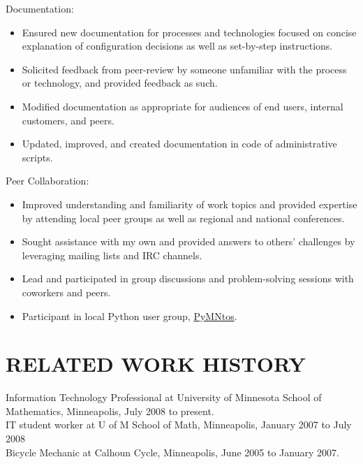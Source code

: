 \documentclass[line,margin]{res}
\begin{document}
\begin{resume}
    Documentation:
    \vspace{2 mm}
    \begin{itemize} \itemsep -1pt %
        \item Ensured new documentation for processes and technologies
        focused on concise explanation of configuration decisions as well
        as set-by-step instructions.
        \item Solicited feedback from peer-review by someone unfamiliar
        with the process or technology, and provided feedback as such.
        \item Modified documentation as appropriate for audiences of end
        users, internal customers, and peers.
        \item Updated, improved, and created documentation in code of
        administrative scripts.
    \end{itemize}

    Peer Collaboration:
    \vspace{2 mm}
    \begin{itemize} \itemsep -1pt %
        \item Improved understanding and familiarity of work topics and
        provided expertise by attending local peer groups as well as
        regional and national conferences.
        \item Sought assistance with my own and provided answers to
        others' challenges by leveraging mailing lists and IRC channels.
        \item Lead and participated in group discussions and
        problem-solving sessions with coworkers and peers.
        \item Participant in local Python user group,
        \href{http://www.python.mn/}{PyMNtos}. 
    \end{itemize}


\section{RELATED WORK HISTORY}
    Information Technology Professional at University of Minnesota School
    of Mathematics, Minneapolis, July 2008 to present.
    \vspace{1.5 mm} \\
    IT student worker at U of M School of Math, Minneapolis, January 2007
    to July 2008
    \vspace{1.5 mm} \\
    Bicycle Mechanic at Calhoun Cycle, Minneapolis, June 2005 to January
    2007.


\end{resume}
\end{document}
